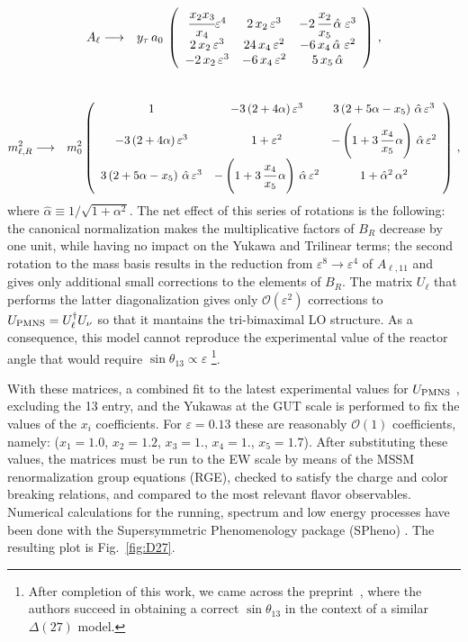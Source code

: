 \documentclass[a4paper,11pt]{article}
\newcommand{\bea}{\begin{eqnarray}}
\newcommand{\eea}{\end{eqnarray}}
\newcommand{\vep}{\varepsilon}
\newcommand{\nn}{\nonumber}
\begin{document}
\bea
  A_\ell & \longrightarrow & y_\tau\, a_{0}\, \left(\begin{array}{ccc}
 \cfrac{x_2 x_3}{x_4} \vep^4 & 2\,x_2\,\vep^3 & -2\,\cfrac{x_2}{x_5}\,\hat\alpha\;\vep^3 \\
               2\,x_2\,\vep^3 &    24\,x_4\,\vep^2 & -6\,x_4\,\hat\alpha\;\vep^2 \\
               -2\,x_2\,\vep^3 &  -6\,x_4\,\vep^2 & 5\,x_5\,\hat\alpha  
                             \end{array} \right)\, ,
\eea
\\
\bea
  m_{\ell,R}^2 & \longrightarrow &  m_{0}^2 \left(\begin{array}{ccc}                                    
             1 & -3\left(2+4\alpha\right) \vep^3 & 3\left(2+5\alpha-x_5\right)\,\hat\alpha\,\vep^3 \nn  \vspace{0.2cm} \\         
-3\left(2+4\alpha\right) \vep^3 & 1+\vep^2   & -\left(1+3\,\cfrac{x_4}{x_5}\,\alpha\right)\,\hat\alpha\,\vep^2 \nn \\
3\left(2+5\alpha-x_5\right)\,\hat\alpha\,\vep^3 & -\left(1+3\,\cfrac{x_4}{x_5}\,\alpha\right)\,\hat\alpha\,\vep^2 &  1+\hat\alpha^2\,\alpha^2
                                         \end{array} \right)\,,\\
  \eea
where $\hat\alpha\equiv1/\sqrt{1+\alpha^2}$.  The net effect of this series of rotations is the following: the canonical normalization makes the multiplicative factors of $B_R$ decrease by one unit, while having no impact on the Yukawa and Trilinear terms; the second rotation to the mass basis results in the reduction from $\vep^8\to\vep^4$ of $A_{\ell,11}$ and gives only additional small corrections to the elements of $B_R$. The matrix $U_\ell$ that performs the latter diagonalization gives only $\mathcal{O}(\vep^2)$ corrections to  $U_{\rm PMNS}=U_{\ell}^\dagger U_{\nu}$ so that it mantains the tri-bimaximal LO structure. As a consequence, this model cannot reproduce the experimental value of the reactor angle that would require $\sin\theta_{13}\propto \vep$ \footnote{After completion of this work, we came across the preprint~\cite{deMedeirosVarzielas:2017sdv}, where the authors succeed in obtaining a correct $\sin\theta_{13}$ in the context of a similar $\Delta (27)$ model.}. 

With these matrices, a combined fit to the latest experimental values for $U_{\rm PMNS}$ \cite{Patrignani:2016xqp}, excluding the 13 entry, and the Yukawas at the GUT scale \cite{Antusch:2013jca} is performed to fix the values of the $x_i$ coefficients. For $\vep=0.13$  these are reasonably $\mathcal{O}(1)$ coefficients, namely: ($x_1=1.0$, $x_2=1.2$, $x_3=1.$, $x_4=1.$, $x_5=1.7$). After substituting these values, the matrices must be run to the EW scale by means of the MSSM renormalization group equations (RGE), checked to satisfy the charge and color breaking relations, and compared to the most relevant flavor observables. Numerical calculations for the running, spectrum and low energy processes have been done with the Supersymmetric Phenomenology package (SPheno) \cite{Porod:2011nf, Porod:2003um}. The resulting plot is Fig.~\ref{fig:D27}.
\end{document}
